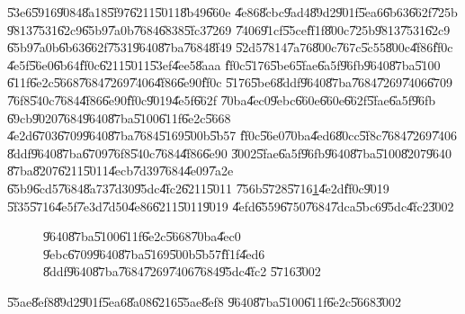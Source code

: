 \bigskip

\U{53e6}\U{5916}\U{9084}\U{8a18}\U{5f97}\U{6211}\U{5011}\U{8b49}\U{660e}%
\U{4e86}\U{8cbc}\U{9ad4}\U{89d2}\U{901f}\U{5ea6}\U{6b63}\U{662f}\U{725b}%
\U{9813}\U{7531}\U{62c9}\U{65b9}\U{7a0b}\U{7684}\U{6838}\U{5fc3}\U{7269}%
\U{7406}\U{91cf}\U{55ce}\U{ff1f}\U{800c}\U{725b}\U{9813}\U{7531}\U{62c9}%
\U{65b9}\U{7a0b}\U{6b63}\U{662f}\U{7531}\U{9640}\U{87ba}\U{7684}\U{8f49}%
\U{52d5}\U{7814}\U{7a76}\U{800c}\U{767c}\U{5c55}\U{800c}\U{4f86}\U{ff0c}%
\U{4e5f}\U{56e0}\U{6b64}\U{ff0c}\U{6211}\U{5011}\U{53ef}\U{4ee5}\U{8aaa}%
\U{ff0c}\U{5176}\U{5be6}\U{5fae}\U{6a5f}\U{96fb}\U{9640}\U{87ba}\U{5100}%
\U{611f}\U{6e2c}\U{5668}\U{7684}\U{7269}\U{7406}\U{4f86}\U{6e90}\U{ff0c}%
\U{5176}\U{5be6}\U{8ddf}\U{9640}\U{87ba}\U{7684}\U{7269}\U{7406}\U{6709}%
\U{76f8}\U{540c}\U{7684}\U{4f86}\U{6e90}\U{ff0c}\U{9019}\U{4e5f}\U{662f}%
\U{70ba}\U{4ec0}\U{9ebc}\U{660e}\U{660e}\U{662f}\U{5fae}\U{6a5f}\U{96fb}%
\U{69cb}\U{9020}\U{7684}\U{9640}\U{87ba}\U{5100}\U{611f}\U{6e2c}\U{5668}%
\U{4e2d}\U{6703}\U{6709}\U{9640}\U{87ba}\U{7684}\U{5169}\U{500b}\U{5b57}%
\U{ff0c}\U{56e0}\U{70ba}\U{4ed6}\U{80cc}\U{5f8c}\U{7684}\U{7269}\U{7406}%
\U{8ddf}\U{9640}\U{87ba}\U{6709}\U{76f8}\U{540c}\U{7684}\U{4f86}\U{6e90}%
\U{3002}\U{5fae}\U{6a5f}\U{96fb}\U{9640}\U{87ba}\U{5100}\U{8207}\U{9640}%
\U{87ba}\U{8207}\U{6211}\U{5011}\U{4ecb}\U{7d39}\U{7684}\U{4e09}\U{7a2e}%
\U{65b9}\U{6cd5}\U{7684}\U{8a73}\U{7d30}\U{95dc}\U{4fc2}\U{6211}\U{5011}%
\U{756b}\U{5728}\U{5716}\ref{gyro_relation_graph}\U{4e2d}\U{ff0c}\U{9019}%
\U{5f35}\U{5716}\U{4e5f}\U{7e3d}\U{7d50}\U{4e86}\U{6211}\U{5011}\U{9019}%
\U{4efd}\U{6559}\U{6750}\U{7684}\U{7dca}\U{5bc6}\U{95dc}\U{4fc2}\U{3002}

\begin{figure}[th]
\caption{\U{9640}\U{87ba}\U{5100}\U{611f}\U{6e2c}\U{5668}\U{70ba}\U{4ec0}%
\U{9ebc}\U{6709}\U{9640}\U{87ba}\U{5169}\U{500b}\U{5b57}\U{ff1f}\U{4ed6}%
\U{8ddf}\U{9640}\U{87ba}\U{7684}\U{7269}\U{7406}\U{7684}\U{95dc}\U{4fc2}%
\U{5716}\U{3002}}
\label{gyro_relation_graph}
\begin{center}

\end{center}
\end{figure}

\clearpage%

\begin{case}
\U{55ae}\U{8ef8}\U{89d2}\U{901f}\U{5ea6}\U{8a08}\U{6216}\U{55ae}\U{8ef8}%
\U{9640}\U{87ba}\U{5100}\U{611f}\U{6e2c}\U{5668}\U{3002}
\end{case}


